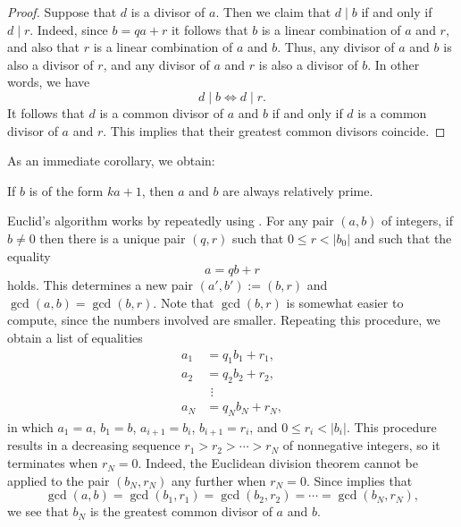 \begin{proof}
  Suppose that $d$ is a divisor of $a$. Then we claim that $d\mid b$ if and only if $d\mid r$. Indeed, since $b=qa +r$ it follows that $b$ is a linear combination of $a$ and $r$, and also that $r$ is a linear combination of $a$ and $b$. Thus, any divisor of $a$ and $b$ is also a divisor of $r$, and any divisor of $a$ and $r$ is also a divisor of $b$. In other words, we have
  \begin{equation*}
    d\mid b \Leftrightarrow d\mid r.
  \end{equation*}
  It follows that $d$ is a common divisor of $a$ and $b$ if and only if $d$ is a common divisor of $a$ and $r$. This implies that their greatest common divisors coincide.
\end{proof}

As an immediate corollary, we obtain:

\begin{corollary}\label{corollary:gcd-euclidean-division}
  If $b$ is of the form $ka+1$, then $a$ and $b$ are always relatively prime.
\end{corollary}

Euclid's algorithm works by repeatedly using . For any pair $(a,b)$ of integers, if $b\neq 0$ then there is a unique pair $(q,r)$ such that $0\leq r<|b_0|$ and such that the equality
\begin{equation*}
  a=qb+r
\end{equation*}
holds. This determines a new pair $(a',b'):=(b,r)$ and $\gcd(a,b)=\gcd(b,r)$. Note that $\gcd(b,r)$ is somewhat easier to compute, since the numbers involved are smaller. Repeating this procedure, we obtain a list of equalities
\begin{align*}
  a_1 & =q_1b_1+r_1, \\
  a_2 & =q_2b_2+r_2, \\
      & ~\,\vdots \\
  a_N & = q_Nb_N+r_N,
\end{align*}
in which $a_1=a$, $b_1=b$, $a_{i+1}=b_i$, $b_{i+1}=r_i$, and $0\leq r_i<|b_i|$. This procedure results in a decreasing sequence $r_1>r_2>\cdots>r_N$ of nonnegative integers, so it terminates when $r_N=0$. Indeed, the Euclidean division theorem cannot be applied to the pair $(b_N,r_N)$ any further when $r_N=0$. Since  implies that
\begin{equation*}
  \gcd(a,b)=\gcd(b_1,r_1)=\gcd(b_2,r_2)=\cdots=\gcd(b_N,r_N),
\end{equation*}
we see that $b_N$ is the greatest common divisor of $a$ and $b$.

